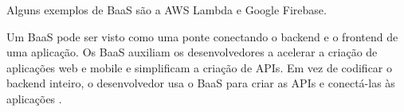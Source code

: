 Alguns exemplos de BaaS são a AWS Lambda e Google Firebase.

\begin{citacao}
Um BaaS pode ser visto como uma ponte conectando o backend e o frontend de uma aplicação.
Os BaaS auxiliam os desenvolvedores a acelerar a criação de aplicações web e mobile e
simplificam a criação de APIs. Em vez de codificar o backend inteiro, o desenvolvedor usa
o BaaS para criar as APIs e conectá-las às aplicações \cite{backend-as-a-service-pros-e-contras}.
\end{citacao}



